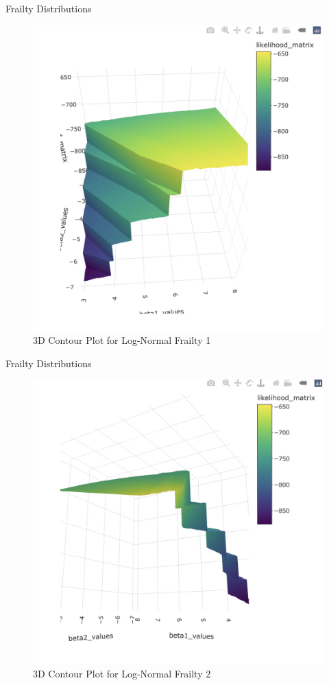 \documentclass [aspectratio=169]{beamer}
\begin{document}
\begin{frame}{Frailty Distributions}
    \begin{figure}[!htb]
        \centering
        \includegraphics[width=0.5\linewidth]{figures/lognormal frailty 3D 1.jpeg}
        \caption{3D Contour Plot for Log-Normal Frailty 1}
    \end{figure}
\end{frame}

\begin{frame}{Frailty Distributions}
    \begin{figure}[!htb]
        \centering
        \includegraphics[width=0.5\linewidth]{figures/lognormal frailty 3D 2.jpeg}
        \caption{3D Contour Plot for Log-Normal Frailty 2}
    \end{figure}
\end{frame}
\end{document}
